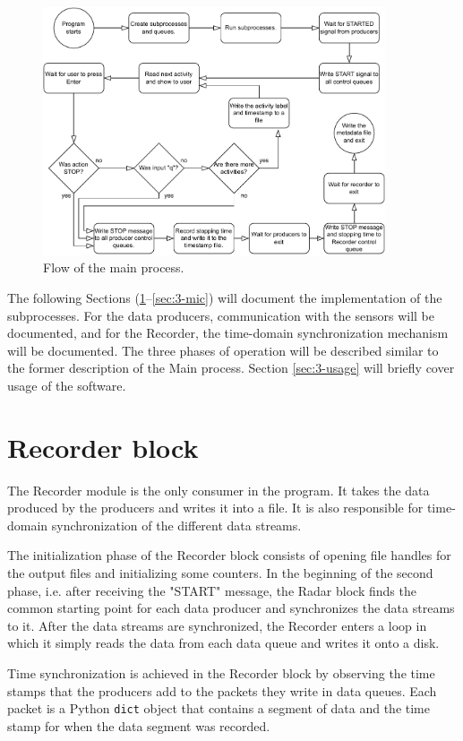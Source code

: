 \begin{figure}[H]
    \centering
    \includegraphics[width=0.9\textwidth]{fig/3/main-flowchart.pdf}
    \caption{Flow of the main process.}
    \label{fig:3-main-flowchart}
\end{figure}

The following Sections (\ref{sec:3-recorder}--\ref{sec:3-mic}) will document the implementation of the subprocesses.
For the data producers, communication with the sensors will be documented, and for the Recorder,
the time-domain synchronization mechanism will be documented.
The three phases of operation will be described similar to the former description of the Main process.
Section \ref{sec:3-usage} will briefly cover usage of the software.

\section{Recorder block}
\label{sec:3-recorder}
The Recorder module is the only consumer in the program.
It takes the data produced by the producers and writes it into a file.
It is also responsible for time-domain synchronization of the different data streams.

The initialization phase of the Recorder block consists of opening file handles for the output files and initializing some counters.
In the beginning of the second phase, i.e. after receiving the "START" message,
the Radar block finds the common starting point for each data producer and synchronizes the data streams to it.
After the data streams are synchronized, the Recorder enters a loop in which it simply reads the data from each data queue and writes it onto a disk.

Time synchronization is achieved in the Recorder block by observing the time stamps that the producers add to the packets they write in data queues.
Each packet is a Python \texttt{dict} object that contains a segment of data and the time stamp for when the data segment was recorded.

